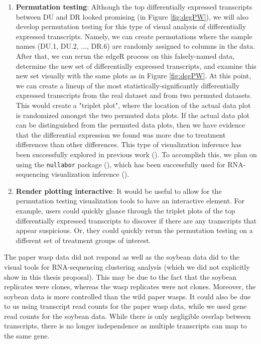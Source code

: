 \documentclass[11pt,a4paper,oldfontcommands,openany]{memoir}
\numberwithin{equation}{section} %
\newcommand{\pkg}[1]{{\texttt{#1}}}
\begin{document}
\begin{enumerate}
\item \textbf{Permutation testing}: Although the top differentially expressed transcripts between DU and DR looked promising (in Figure \ref{fig:degPW}), we will also develop permutation testing for this type of visual analysis of differentially expressed transcripts. Namely, we can create permutations where the sample names (DU.1, DU.2, ..., DR.6) are randomly assigned to columns in the data. After that, we can rerun the edgeR process on this falsely-named data, determine the new set of differentially expressed transcripts, and examine this new set visually with the same plots as in Figure \ref{fig:degPW}. At this point, we can create a lineup of the most statistically-significantly differentially expressed transcripts from the real dataset and from two permuted datasets. This would create a "triplet plot", where the location of the actual data plot is randomized amongst the two permuted data plots. If the actual data plot can be distinguished from the permuted data plots, then we have evidence that the differential expression we found was more due to treatment differences than other differences. This type of visualization inference has been successfully explored in previous work (\citealt{extra6}). To accomplish this, we plan on using the \pkg{nullabor} package (\citealt{nullabor}), which has been successfully used for RNA-sequencing visualization inference (\citealt{extra1}).

\item \textbf{Render plotting interactive}: It would be useful to allow for the permutation testing visualization tools to have an interactive element. For example, users could quickly glance through the triplet plots of the top differentially expressed transcripts to discover if there are any transcripts that appear suspicious. Or, they could quickly rerun the permutation testing on a different set of treatment groups of interest.

\end{enumerate}

The paper wasp data did not respond as well as the soybean data did to the visual tools for RNA-sequencing clustering analysis (which we did not explicitly show in this thesis proposal). This may be due to the fact that the soybean replicates were clones, whereas the wasp replicates were not clones. Moreover, the soybean data is more controlled than the wild paper wasps. It could also be due to us using transcript read counts for the paper wasp data, while we used gene read counts for the soybean data. While there is only negligible overlap between transcripts, there is no longer independence as multiple transcripts can map to the same gene.
\end{document}

